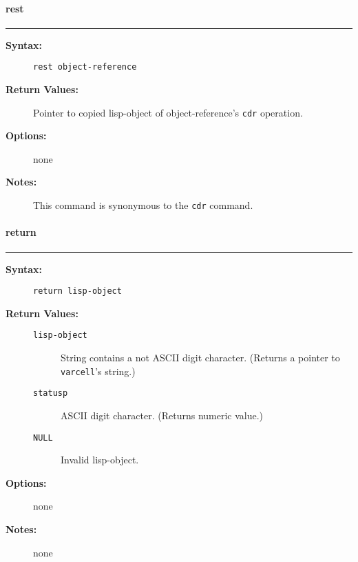 \vspace {2pt}


\paragraph{rest}

\hrule
\begin{description}
\item[{\bf Syntax:}] \mbox{}

{\tt rest object-reference}

\item[{\bf Return Values:}] \mbox{}

Pointer to copied lisp-object of 
object-reference's {\tt cdr} operation.

\item[{\bf Options:}] \mbox{}

none  

\item[{\bf Notes:}] \mbox{}

This command is synonymous to the {\tt cdr}
command.

\end{description}


\vspace {2pt}


\paragraph{return}

\hrule
\begin{description}
\item[{\bf Syntax:}] \mbox{}

{\tt return lisp-object}

\item[{\bf Return Values:}] \mbox{}

\begin{description}
\item[{\tt lisp-object}] \mbox{}

String contains a not ASCII digit character.    
(Returns a pointer to {\tt varcell}'s string.)

\item[{\tt statusp}] \mbox{}

ASCII digit character. (Returns numeric value.)

\item[{\tt NULL}] \mbox{}

Invalid lisp-object.

\end{description}


\item[{\bf Options:}] \mbox{}

none  

\item[{\bf Notes:}] \mbox{}

none  

\end{description}


